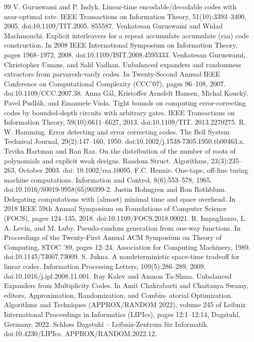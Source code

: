 \begin{thebibliography}{99}
 V. Guruswami and P. Indyk. Linear-time encodable/decodable codes with near-optimal rate. IEEE Transactions on Information Theory, 51(10):3393–3400, 2005. doi:10.1109/TIT.2005. 855587.
 Venkatesan Guruswami and Widad Machmouchi. Explicit interleavers for a repeat accumulate accumulate (raa) code construction. In 2008 IEEE International Symposium on Information Theory, pages 1968–1972, 2008. doi:10.1109/ISIT.2008.4595333.
 Venkatesan Guruswami, Christopher Umans, and Salil Vadhan. Unbalanced expanders and randomness extractors from parvaresh-vardy codes. In Twenty-Second Annual IEEE Conference on Computational Complexity (CCC’07), pages 96–108, 2007. doi:10.1109/CCC.2007.38.
 Anna Gál, Kristoffer Arnsfelt Hansen, Michal Koucký, Pavel Pudlák, and Emanuele Viola. Tight bounds on computing error-correcting codes by bounded-depth circuits with arbitrary gates. IEEE Transactions on Information Theory, 59(10):6611–6627, 2013. doi:10.1109/TIT. 2013.2270275.
 R. W. Hamming. Error detecting and error correcting codes. The Bell System Technical Journal, 29(2):147–160, 1950. doi:10.1002/j.1538-7305.1950.tb00463.x.
 Tzvika Hartman and Ran Raz. On the distribution of the number of roots of polynomials and explicit weak designs. Random Struct. Algorithms, 23(3):235–263, October 2003. doi: 10.1002/rsa.10095.
 F.C. Hennie. One-tape, off-line turing machine computations. Information and Control, 8(6):553–578, 1965. doi:10.1016/S0019-9958(65)90399-2.
 Justin Holmgren and Ron Rothblum. Delegating computations with (almost) minimal time and space overhead. In 2018 IEEE 59th Annual Symposium on Foundations of Computer Science (FOCS), pages 124–135, 2018. doi:10.1109/FOCS.2018.00021.
 R. Impagliazzo, L. A. Levin, and M. Luby. Pseudo-random generation from one-way functions. In Proceedings of the Twenty-First Annual ACM Symposium on Theory of Computing, STOC ’89, pages 12–24. Association for Computing Machinery, 1989. doi:10.1145/73007.73009.
 S. Jukna. A nondeterministic space-time tradeoff for linear codes. Information Processing Letters, 109(5):286–289, 2009. doi:10.1016/j.ipl.2008.11.001.
 Itay Kalev and Amnon Ta-Shma. Unbalanced Expanders from Multiplicity Codes. In Amit Chakrabarti and Chaitanya Swamy, editors, Approximation, Randomization, and Combin- atorial Optimization. Algorithms and Techniques (APPROX/RANDOM 2022), volume 245 of Leibniz International Proceedings in Informatics (LIPIcs), pages 12:1–12:14, Dagstuhl, Germany, 2022. Schloss Dagstuhl – Leibniz-Zentrum für Informatik. doi:10.4230/LIPIcs. APPROX/RANDOM.2022.12.

\end{thebibliography}
